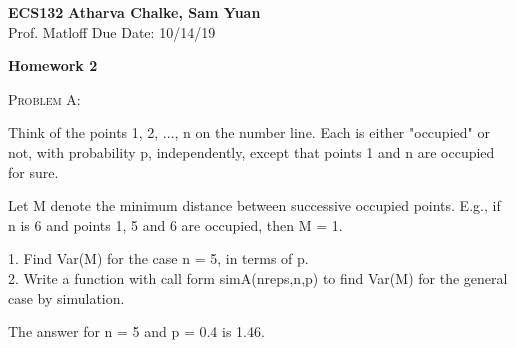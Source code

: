 \documentclass[12pt]{article}
\newenvironment{statement}[1]
{\begin{mdframed}[linewidth=0.6pt]
        \textsc{ #1:}

}
    {\end{mdframed}}
\begin{document}
\noindent
\textbf{ECS132} \hfill \textbf{Atharva Chalke, Sam Yuan} \\
\normalsize Prof. Matloff \hfill Due Date: 10/14/19 \\


\begin{center}
\textbf{Homework 2}
\end{center}

\begin{statement}{Problem A}
Think of the points 1, 2, ..., n on the number line. Each is either "occupied" or not, with probability p, independently, except that points 1 and n are occupied for sure.

Let M denote the minimum distance between successive occupied points. E.g., if n is 6 and points 1, 5 and 6 are occupied, then M = 1.

1. Find Var(M) for the case n = 5, in terms of p.\\
2. Write a function with call form
simA(nreps,n,p)
to find Var(M) for the general case by simulation.

The answer for n = 5 and p = 0.4 is 1.46.
\end{statement}

\end{document}
